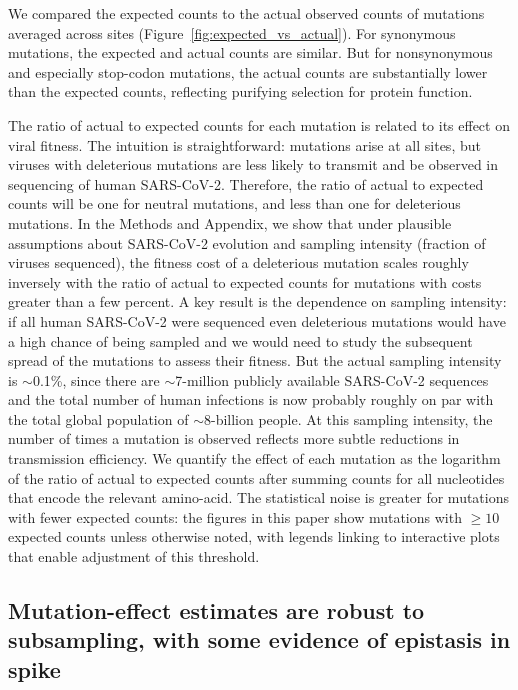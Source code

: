 \documentclass[9pt,twocolumn,twoside]{gsajnl_modified}
\begin{document}
We compared the expected counts to the actual observed counts of mutations averaged across sites (Figure~\ref{fig:expected_vs_actual}).
For synonymous mutations, the expected and actual counts are similar.
But for nonsynonymous and especially stop-codon mutations, the actual counts are substantially lower than the expected counts, reflecting purifying selection for protein function.

The ratio of actual to expected counts for each mutation is related to its effect on viral fitness.
The intuition is straightforward: mutations arise at all sites, but viruses with deleterious mutations are less likely to transmit and be observed in sequencing of human SARS-CoV-2.
Therefore, the ratio of actual to expected counts will be one for neutral mutations, and less than one for deleterious mutations.
In the Methods and Appendix, we show that under plausible assumptions about SARS-CoV-2 evolution and sampling intensity (fraction of viruses sequenced), the fitness cost of a deleterious mutation scales roughly inversely with the ratio of actual to expected counts for mutations with costs greater than a few percent.
A key result is the dependence on sampling intensity: if all human SARS-CoV-2 were sequenced even deleterious mutations would have a high chance of being sampled and we would need to study the subsequent spread of the mutations to assess their fitness.
But the actual sampling intensity is $\sim$0.1\%, since there are $\sim$7-million publicly available SARS-CoV-2 sequences and the total number of human infections is now probably roughly on par with the total global population of $\sim$8-billion people.
At this sampling intensity, the number of times a mutation is observed reflects more subtle reductions in transmission efficiency.
We quantify the effect of each mutation as the logarithm of the ratio of actual to expected counts after summing counts for all nucleotides that encode the relevant amino-acid.
The statistical noise is greater for mutations with fewer expected counts: the figures in this paper show mutations with $\ge10$ expected counts unless otherwise noted, with legends linking to interactive plots that enable adjustment of this threshold.

\subsection*{Mutation-effect estimates are robust to subsampling, with some evidence of epistasis in spike}
\end{document}
